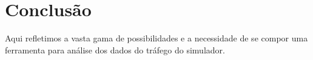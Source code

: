 %
%
%  
%
%


\section{Conclusão}

Aqui refletimos a vasta gama de possibilidades e a necessidade de se compor
uma ferramenta para análise dos dados do tráfego do simulador.

